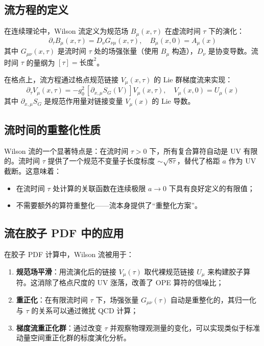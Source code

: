 \documentclass[11pt,a4paper]{ctexart}
\begin{document}
\subsection{流方程的定义}

在连续理论中，Wilson 流定义为规范场 $B_\mu(x,\tau)$ 在虚流时间 $\tau$ 下的演化：
\begin{equation}
\partial_\tau B_\mu(x,\tau) = D_\nu G_{\nu\mu}(x,\tau), \quad B_\mu(x,0) = A_\mu(x)
\end{equation}
其中 $G_{\mu\nu}(x,\tau)$ 是流时间 $\tau$ 处的场强张量（使用 $B_\mu$ 构造），$D_\nu$ 是协变导数。流时间 $\tau$ 的量纲为 $[\tau] = \text{长度}^2$。

在格点上，流方程通过格点规范链接 $V_\mu(x,\tau)$ 的 Lie 群梯度流来实现：
\begin{equation}
\partial_\tau V_\mu(x,\tau) = -g_0^2 \, \left[ \partial_{x,\mu} S_G(V) \right] V_\mu(x,\tau), \quad V_\mu(x,0) = U_\mu(x)
\end{equation}
其中 $\partial_{x,\mu} S_G$ 是规范作用量对链接变量 $V_\mu(x)$ 的 Lie 导数。

\subsection{流时间的重整化性质}

Wilson 流的一个显著特点是：在流时间 $\tau > 0$ 下，所有复合算符自动是 UV 有限的。流时间 $\tau$ 提供了一个规范不变量子长度标度 $\sim \sqrt{8\tau}$，替代了格距 $a$ 作为 UV 截断。这意味着：
\begin{itemize}
  \item 在流时间 $\tau$ 处计算的关联函数在连续极限 $a \to 0$ 下具有良好定义的有限值；
  \item 不需要额外的算符重整化——流本身提供了``重整化方案''。
\end{itemize}

\subsection{流在胶子 PDF 中的应用}

在胶子 PDF 计算中，Wilson 流被用于：
\begin{enumerate}
  \item \textbf{规范场平滑}：用流演化后的链接 $V_\mu(\tau)$ 取代裸规范链接 $U_\mu$ 来构建胶子算符。这消除了格点尺度的 UV 涨落，改善了 OPE 算符的信噪比；
  \item \textbf{重正化}：在有限流时间 $\tau$ 下，场强张量 $G_{\mu\nu}(\tau)$ 自动是重整化的，其归一化与 $\tau$ 的关系可以通过微扰 QCD 计算；
  \item \textbf{梯度流重正化群}：通过改变 $\tau$ 并观察物理观测量的变化，可以实现类似于标准动量空间重正化群的标度演化分析。
\end{enumerate}
\end{document}
